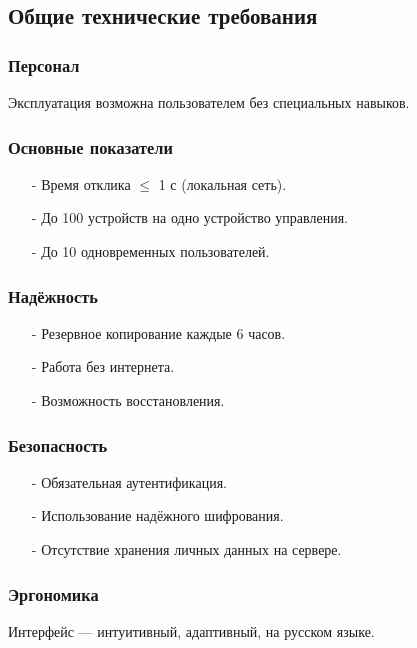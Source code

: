 \documentclass[oneside,a4paper,14pt]{extarticle}
\begin{document}
\subsection{Общие технические требования}

\subsubsection{Персонал}
Эксплуатация возможна пользователем без специальных навыков.

\subsubsection{Основные показатели}
\begin{itemize}
    \item[-] Время отклика $\leq$ 1 с (локальная сеть).
    \item[-] До 100 устройств на одно устройство управления.
    \item[-] До 10 одновременных пользователей.
\end{itemize}

\subsubsection{Надёжность}
\begin{itemize}
    \item[-] Резервное копирование каждые 6 часов.
    \item[-] Работа без интернета.
    \item[-] Возможность восстановления.
\end{itemize}

\subsubsection{Безопасность}
\begin{itemize}
    \item[-] Обязательная аутентификация.
    \item[-] Использование надёжного шифрования.
    \item[-] Отсутствие хранения личных данных на сервере.
\end{itemize}

\subsubsection{Эргономика}
Интерфейс — интуитивный, адаптивный, на русском языке.
\end{document}
